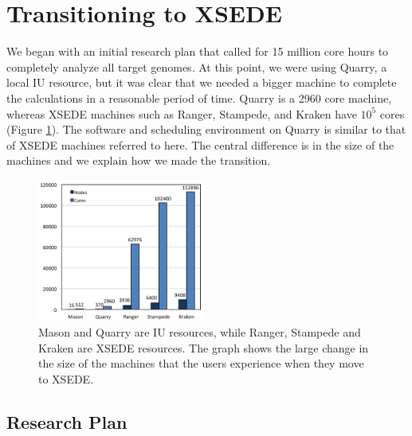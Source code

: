 \documentclass{sig-alternate}
\newcommand{\abhi}[1]{ {\textcolor{red} { ***Abhinav: #1 }}}
\newcommand{\abhi}[1]{ {}}
\begin{document}
\section{Transitioning to XSEDE}\label{sec:resources}
We began with an initial research plan that called for 15 million core hours to completely
analyze all target genomes. At this point, we were using
Quarry, a local IU resource, but it was clear that we needed a bigger machine to complete the calculations in
a reasonable period of time. Quarry is a 2960 core machine, whereas XSEDE machines such as Ranger, Stampede,
and Kraken have $10^5$ cores (Figure \ref{fig:scaling}). The
software and scheduling environment on Quarry is similar to that of XSEDE machines referred to here. The
central difference is in the size of the machines and we explain how
we made the transition.
%


\begin{figure} %
\centering
\includegraphics[width=0.49\textwidth]{figures/cores-nodes.png}
\caption{Mason and Quarry are IU resources, while Ranger, Stampede and Kraken are XSEDE resources. The graph shows the large change in the size of the machines that the users experience when they move to XSEDE.  }
\label{fig:scaling}
\end{figure}

\subsection{Research Plan}\label{sec:plan}
\end{document}

